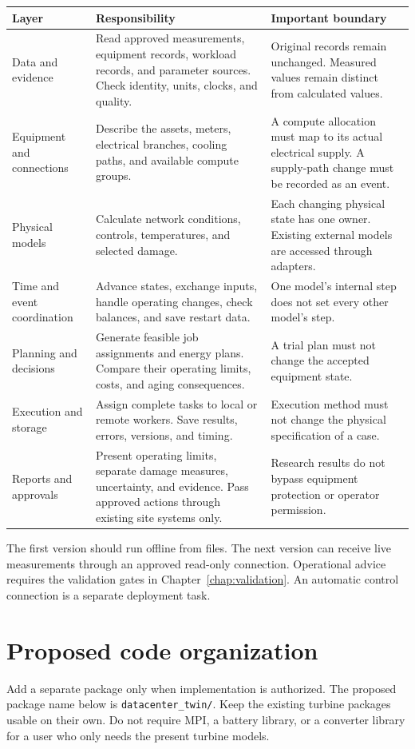 \documentclass[11pt,a4paper]{report}
\newcommand{\sourcefile}[1]{\nolinkurl{#1}}
\begin{document}
\begin{longtable}{L{0.19\textwidth}L{0.34\textwidth}L{0.35\textwidth}}
\toprule Layer & Responsibility & Important boundary \\ \midrule\endhead
Data and evidence & Read approved measurements, equipment records, workload records, and parameter sources. Check identity, units, clocks, and quality. & Original records remain unchanged. Measured values remain distinct from calculated values. \\
Equipment and connections & Describe the assets, meters, electrical branches, cooling paths, and available compute groups. & A compute allocation must map to its actual electrical supply. A supply-path change must be recorded as an event. \\
Physical models & Calculate network conditions, controls, temperatures, and selected damage. & Each changing physical state has one owner. Existing external models are accessed through adapters. \\
Time and event coordination & Advance states, exchange inputs, handle operating changes, check balances, and save restart data. & One model's internal step does not set every other model's step. \\
Planning and decisions & Generate feasible job assignments and energy plans. Compare their operating limits, costs, and aging consequences. & A trial plan must not change the accepted equipment state. \\
Execution and storage & Assign complete tasks to local or remote workers. Save results, errors, versions, and timing. & Execution method must not change the physical specification of a case. \\
Reports and approvals & Present operating limits, separate damage measures, uncertainty, and evidence. Pass approved actions through existing site systems only. & Research results do not bypass equipment protection or operator permission. \\
\bottomrule
\end{longtable}

The first version should run offline from files.
The next version can receive live measurements through an approved read-only connection.
Operational advice requires the validation gates in Chapter~\ref{chap:validation}.
An automatic control connection is a separate deployment task.

\section{Proposed code organization}
Add a separate package only when implementation is authorized.
The proposed package name below is \sourcefile{datacenter_twin/}.
Keep the existing turbine packages usable on their own.
Do not require MPI, a battery library, or a converter library for a user who only needs the present turbine models.
\end{document}

